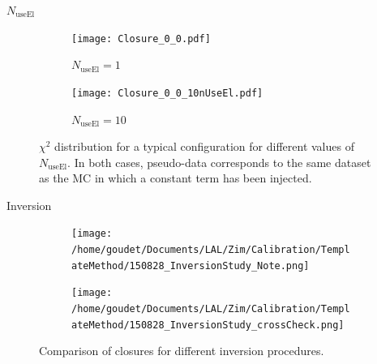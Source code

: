 \begin{frame}{$N_\text{useEl}$}
  \begin{figure}
\begin{subfigure}[t]{0.49\linewidth}
\begin{center}
\texttt{[image: Closure\_0\_0.pdf]}
\end{center}
\caption{$N_\text{useEl}=1$}
\end{subfigure}
\begin{subfigure}[t]{0.49\linewidth}
\begin{center}
\texttt{[image: Closure\_0\_0\_10nUseEl.pdf]}
\end{center}
\caption{$N_\text{useEl}=10$}
\end{subfigure}
\caption{\label{org98e07ca}
$\chi^2$ distribution for a typical configuration for different values of $N_\text{useEl}$. In both cases, pseudo-data corresponds to the same dataset as the MC in which a constant term has been injected.}
\end{figure}
\end{frame}

\begin{frame}{Inversion}
  \begin{figure}
\begin{subfigure}[t]{0.49\linewidth}
\begin{center}
\texttt{[image: /home/goudet/Documents/LAL/Zim/Calibration/TemplateMethod/150828\_InversionStudy\_Note.png]}
\end{center}
\end{subfigure}
\begin{subfigure}[t]{0.49\linewidth}
\begin{center}
\texttt{[image: /home/goudet/Documents/LAL/Zim/Calibration/TemplateMethod/150828\_InversionStudy\_crossCheck.png]}
\end{center}
\end{subfigure}
\caption{\label{orgac9241c}
Comparison of closures for different inversion procedures.}
\end{figure}
\end{frame}
